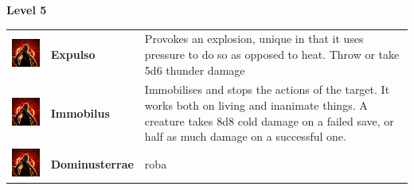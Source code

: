 \textbf{Level 5} 
\begin{tabular}{ m{4cm}m{3cm}m{6cm} } 
	\includegraphics[width=4cm]{../Pictures/Gameplay/Spells/Icon/spell_icon.png} & \textbf{Expulso} &  Provokes an explosion, unique in that it uses pressure to do so as opposed to heat. Throw or take 5d6 thunder damage \\ 
\includegraphics[width=4cm]{../Pictures/Gameplay/Spells/Icon/spell_icon.png} & \textbf{Immobilus} & Immobilises and stops the actions of the target. It works both on living and inanimate things. A creature takes 8d8 cold damage on a failed save, or half as much damage on a successful one.\\
\includegraphics[width=4cm]{../Pictures/Gameplay/Spells/Icon/spell_icon.png} & \textbf{Dominusterrae} & roba \\ 
\end{tabular}


